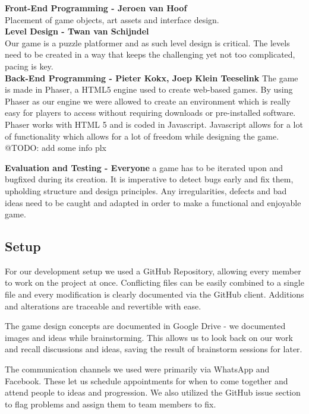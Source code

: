 \documentclass[a4paper,twoside,12pt]{article}
\begin{document}
\textbf{Front-End Programming - Jeroen van Hoof} \\
Placement of game objects, art assets and interface design. \\

\textbf{Level Design - Twan van Schijndel} \\
Our game is a puzzle platformer and as such level design is critical. The levels need to be created in a way that keeps the challenging yet not too complicated, pacing is key. \\

\textbf{Back-End Programming - Pieter Kokx, Joep Klein Teeselink}
The game is made in Phaser, a HTML5 engine used to create web-based games. By using Phaser as our engine we were allowed to create an environment which is really easy for players to access without requiring downloads or pre-installed software. Phaser works with HTML 5 and is coded in Javascript. Javascript allows for a lot of functionality which allows for a lot of freedom while designing the game.
@TODO: add some info plx

\textbf{Evaluation and Testing - Everyone}
a game has to be iterated upon and bugfixed during its creation. It is imperative to detect bugs early and fix them, upholding structure and design principles. Any irregularities, defects and bad ideas need to be caught and adapted in order to make a functional and enjoyable game.\\

\subsection{Setup}

For our development setup we used a GitHub Repository, allowing every member to work on the project at once. Conflicting files can be easily combined to a single file and every modification is clearly documented via the GitHub client. Additions and alterations are traceable and revertible with ease.

The game design concepts are documented in Google Drive - we documented images and ideas while brainstorming. This allows us to look back on our work and recall discussions and ideas, saving the result of brainstorm sessions for later.


The communication channels we used were primarily via WhatsApp and Facebook. These let us schedule appointments for when to come together and attend people to ideas and progression. We also utilized the GitHub issue section to flag problems and assign them to team members to fix.
\end{document}
